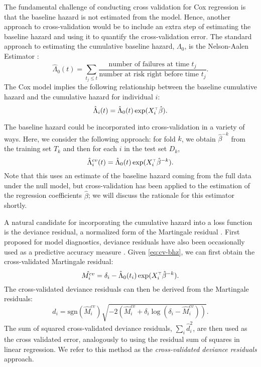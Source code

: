 The fundamental challenge of conducting cross validation for Cox regression is that the baseline hazard is not estimated from the model. Hence, another approach to cross-validation would be to include an extra step of estimating the baseline hazard and using it to quantify the cross-validation error. The standard approach to estimating the cumulative baseline hazard, $\Lambda_0$, is the Nelson-Aalen Estimator \citep{nelson1969, aalen1978}:
\begin{equation}
  \hat{\Lambda}_{0}(t) = \sum_{t_j \leq t}\frac{\text{number of failures at time } t_j}{\text{number at risk right before time }t_j}.
\end{equation}
The Cox model implies the following relationship between the baseline cumulative hazard and the cumulative hazard for individual $i$:
\begin{equation}
  \hat{\Lambda}_{i}(t) =  \hat{\Lambda}_{0}(t)\exp(X_i^{\scriptscriptstyle\top}\hat\beta).
\end{equation}

The baseline hazard could be incorporated into cross-validation in a variety of ways.  Here, we consider the following approach: for fold $k$, we obtain $\hat{\beta}^{-k}$ from the training set $T_k$ and then for each $i$ in the test set $D_k$, 
\begin{equation}
 \label{eq:cv-bhz}
  \hat{\Lambda}^{cv}_{i}(t) =  \hat{\Lambda}_{0}(t)\exp(X_i^{\scriptscriptstyle\top}\hat\beta^{-k}).
\end{equation}
Note that this uses an estimate of the baseline hazard coming from the full data under the null model, but cross-validation has been applied to the estimation of the regression coefficients $\hat{\beta}$; we will discuss the rationale for this estimator shortly.

A natural candidate for incorporating the cumulative hazard into a loss function is the deviance residual, a normalized form of the Martingale residual \citep{Therneau1990}. First proposed for model diagnostics, deviance residuals have also been occasionally used as a predictive accuracy measure \citep{Therneau2018}.  Given \eqref{eq:cv-bhz}, we can first obtain the cross-validated Martingale residual: 
\begin{equation}
  \hat{M^{cv}_{i}} = \delta_{i} - \hat{\Lambda}_{0}(t_{i})\exp(X_i^{\scriptscriptstyle\top}\hat\beta^{-k}).
\end{equation}
The cross-validated deviance residuals can then be derived from the Martingale residuals: 
\begin{equation} 
  d_{i} = \text{sgn}(\hat{M}^{cv}_{i})\sqrt{-2(\hat{M}^{cv}_{i} + \delta_{i}\log(\delta_{i} - \hat{M}^{cv}_{i}))}.
\end{equation}
The sum of squared cross-validated deviance residuals, $\sum_{i}\hat{d}_{i}^2$, are then used as the cross validated error, analogously to using the residual sum of squares in linear regression. We refer to this method as the \emph{cross-validated deviance residuals} approach.


